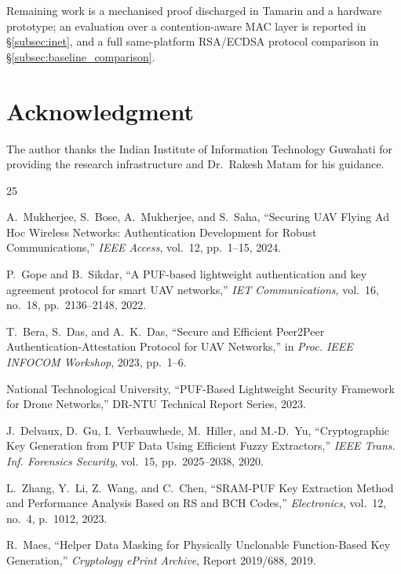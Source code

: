 \documentclass[11pt,a4paper]{article}
\begin{document}
Remaining work is a mechanised proof discharged in Tamarin and a hardware
prototype; an evaluation over a contention-aware MAC layer is reported in
\S\ref{subsec:inet}, and a full same-platform RSA/ECDSA protocol comparison in
\S\ref{subsec:baseline_comparison}.

\section*{Acknowledgment}
The author thanks the Indian Institute of Information Technology Guwahati for
providing the research infrastructure and Dr.\ Rakesh Matam for his guidance.

\begin{thebibliography}{25}

A.~Mukherjee, S.~Bose, A.~Mukherjee, and S.~Saha, ``Securing UAV Flying Ad Hoc Wireless Networks: Authentication Development for Robust Communications,'' \textit{IEEE Access}, vol.~12, pp.~1--15, 2024.

P.~Gope and B.~Sikdar, ``A PUF-based lightweight authentication and key agreement protocol for smart UAV networks,'' \textit{IET Communications}, vol.~16, no.~18, pp.~2136--2148, 2022.

T.~Bera, S.~Das, and A.~K.~Das, ``Secure and Efficient Peer2Peer Authentication-Attestation Protocol for UAV Networks,'' in \textit{Proc. IEEE INFOCOM Workshop}, 2023, pp.~1--6.

National Technological University, ``PUF-Based Lightweight Security Framework for Drone Networks,'' DR-NTU Technical Report Series, 2023.

J.~Delvaux, D.~Gu, I.~Verbauwhede, M.~Hiller, and M.-D.~Yu, ``Cryptographic Key Generation from PUF Data Using Efficient Fuzzy Extractors,'' \textit{IEEE Trans. Inf. Forensics Security}, vol.~15, pp.~2025--2038, 2020.

L.~Zhang, Y.~Li, Z.~Wang, and C.~Chen, ``SRAM-PUF Key Extraction Method and Performance Analysis Based on RS and BCH Codes,'' \textit{Electronics}, vol.~12, no.~4, p.~1012, 2023.

R.~Maes, ``Helper Data Masking for Physically Unclonable Function-Based Key Generation,'' \textit{Cryptology ePrint Archive}, Report 2019/688, 2019.


\end{thebibliography}
\end{document}
